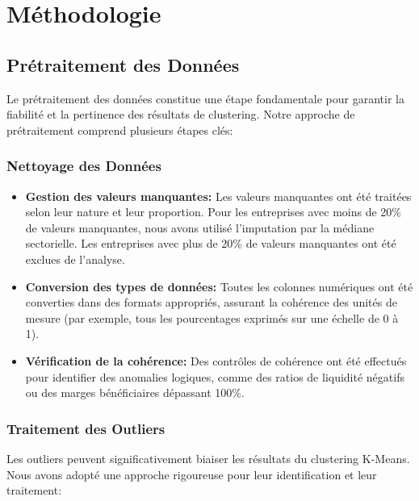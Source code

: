 \documentclass[12pt]{article}
\begin{document}
\newpage
\section{Méthodologie}
\subsection{Prétraitement des Données}
Le prétraitement des données constitue une étape fondamentale pour garantir la fiabilité et la pertinence des résultats de clustering. Notre approche de prétraitement comprend plusieurs étapes clés:

\subsubsection{Nettoyage des Données}
\begin{itemize}
    \item \textbf{Gestion des valeurs manquantes:} Les valeurs manquantes ont été traitées selon leur nature et leur proportion. Pour les entreprises avec moins de 20\% de valeurs manquantes, nous avons utilisé l'imputation par la médiane sectorielle. Les entreprises avec plus de 20\% de valeurs manquantes ont été exclues de l'analyse.
    
    \item \textbf{Conversion des types de données:} Toutes les colonnes numériques ont été converties dans des formats appropriés, assurant la cohérence des unités de mesure (par exemple, tous les pourcentages exprimés sur une échelle de 0 à 1).
    
    \item \textbf{Vérification de la cohérence:} Des contrôles de cohérence ont été effectués pour identifier des anomalies logiques, comme des ratios de liquidité négatifs ou des marges bénéficiaires dépassant 100\%.
\end{itemize}

\subsubsection{Traitement des Outliers}
Les outliers peuvent significativement biaiser les résultats du clustering K-Means. Nous avons adopté une approche rigoureuse pour leur identification et leur traitement:
\end{document}
